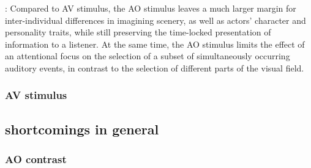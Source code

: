 \documentclass[english]{article}
\begin{document}
\citep{hanke2014audiomovie}: Compared to AV stimulus, the AO stimulus leaves a
much larger margin for inter-individual differences in imagining scenery, as
well as actors' character and personality traits, while still preserving the
time-locked presentation of information to a listener. At the same time, the AO
stimulus limits the effect of an attentional focus on the selection of a subset
of simultaneously occurring auditory events, in contrast to the selection of
different parts of the visual field.




\subsubsection{AV stimulus}


\subsection{shortcomings in general}

\subsubsection{AO contrast}
\end{document}
